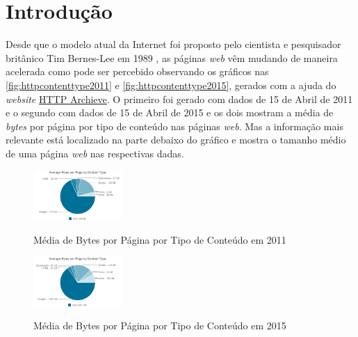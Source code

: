 %
%

\chapter{Introdução}\label{chap:introducao}

Desde que o modelo atual da Internet foi proposto pelo cientista e pesquisador britânico Tim Bernes-Lee em 1989 \cite{WebHistory}, as páginas \textit{web} vêm mudando de maneira acelerada como pode ser percebido observando os gráficos nas \autoref{fig:httpcontenttype2011} e \autoref{fig:httpcontenttype2015}, gerados com a ajuda do \textit{website} \href{http://httparchive.org/}{HTTP Archieve}. O primeiro foi gerado com dados de 15 de Abril de 2011 e o segundo com dados de 15 de Abril de 2015 e os dois mostram a média de \textit{bytes} por página por tipo de conteúdo nas páginas \textit{web}. Mas a informação mais relevante está localizado na parte debaixo do gráfico e mostra o tamanho médio de uma página \textit{web} nas respectivas dadas.

\begin{figure}[!htb]
    \centering
    \caption{Média de Bytes por Página por Tipo de Conteúdo em 2011}
    \includegraphics[width=0.3\textwidth]{./04-figuras/introducao/bytes_content_type_april_2011}
    \label{fig:httpcontenttype2011}
\end{figure}

\begin{figure}[!htb]
    \centering
    \caption{Média de Bytes por Página por Tipo de Conteúdo em 2015}
    \includegraphics[width=0.3\textwidth]{./04-figuras/introducao/bytes_content_type_april_2015}
    \label{fig:httpcontenttype2015}
\end{figure}

